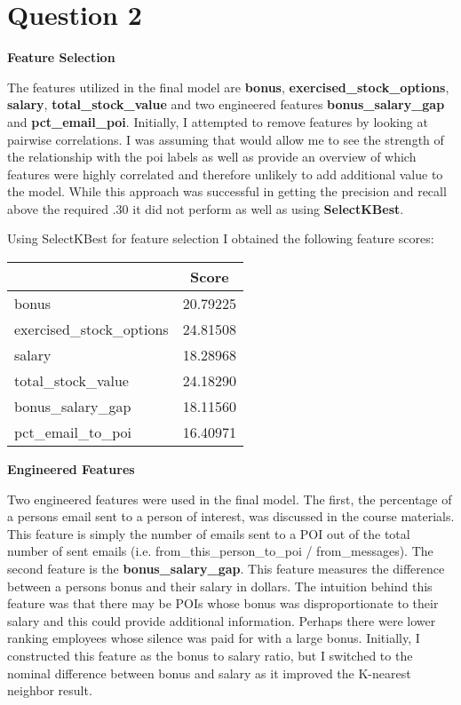 \documentclass[a4paper,11pt]{report}
\begin{document}
\section{Question 2}

\textbf{Feature Selection}

The features utilized in the final model are \textbf{bonus},
\textbf{exercised\_stock\_options}, \textbf{salary}, \textbf{total\_stock\_value}
and two engineered features \textbf{bonus\_salary\_gap} and \textbf{pct\_email\_poi}.
Initially, I attempted to remove features by looking at pairwise correlations. 
I was assuming that would
allow me to see the strength of the relationship with the poi labels as well as
provide an overview of which features were highly correlated and therefore unlikely
to add additional value to the model.  While this approach was successful in
getting the precision and recall above the required .30 it did not perform as
well as using \textbf{SelectKBest}.

Using SelectKBest for feature selection I obtained the following feature scores:

\begin{center}
    \begin{tabular}{|| l c ||}
        \hline & Score \\
        \hline\hline
        bonus & 20.79225 \\
        \hline
        exercised\_stock\_options & 24.81508 \\
        \hline
        salary & 18.28968 \\
        \hline
        total\_stock\_value & 24.18290 \\
        \hline
        bonus\_salary\_gap & 18.11560 \\
        \hline
        pct\_email\_to\_poi & 16.40971 \\
        \hline
    \end{tabular}
\end{center}

\textbf{Engineered Features}

Two engineered features were used in the final model.  The first, the percentage
of a persons email sent to a person of interest, was discussed in the course
materials.  This feature is simply the number of emails sent to a POI out of the
total number of sent emails (i.e. from\_this\_person\_to\_poi / from\_messages).  The
second feature is the \textbf{bonus\_salary\_gap}.  This feature measures the
difference between a persons bonus and their salary in dollars.  The intuition behind this
feature was that there may be POIs whose bonus was disproportionate to their
salary and this could provide additional information.  Perhaps there were lower
ranking employees whose silence was paid for with a large bonus.  Initially, I
constructed this feature as the bonus to salary ratio, but I switched to the
nominal difference between bonus and salary as it improved the K-nearest
neighbor result.
\end{document}
